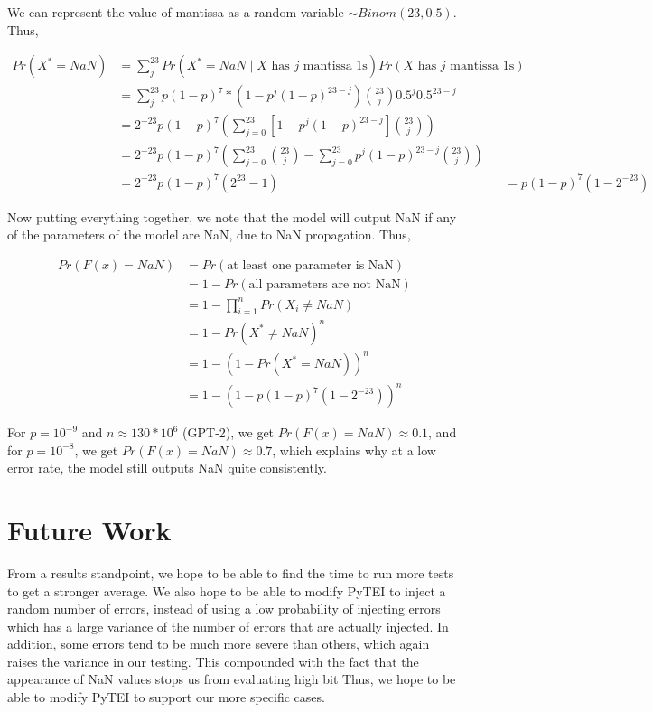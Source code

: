 \documentclass[a4paper]{article}
\begin{document}
We can represent the value of mantissa as a random variable $\sim Binom(23, 0.5)$. Thus,

\begin{align*}
	Pr(X^* = NaN) &= \sum_j^23 Pr(X^* = NaN \mid X \text{ has $j$ mantissa 1s})Pr(X\text{ has $j$ mantissa 1s}) \\
	&= \sum_j^23 p(1 - p)^7 * (1 - p^j(1 - p)^{23 - j})\binom{23}{j}0.5^j0.5^{23 - j} \\
	&= 2^{-23} p (1 - p)^7 \left(\sum_{j=0}^{23}[1 - p^j(1 - p)^{23 - j}] \binom{23}{j}\right) \\
	&= 2^{-23} p (1 - p)^7 \left(\sum_{j=0}^{23}\binom{23}{j} - \sum_{j=0}^{23}p^j(1 - p)^{23 - j} \binom{23}{j}\right) \\
	&= 2^{-23} p (1 - p)^7(2^23 - 1)
	&= p(1 - p)^7(1 - 2^{-23})
\end{align*}

Now putting everything together, we note that the model will output NaN if any of the parameters of the model are NaN, due to NaN propagation. Thus,

\begin{align*}
	Pr(F(x) = NaN) &= Pr(\text{at least one parameter is NaN}) \\
	&= 1 - Pr(\text{all parameters are not NaN}) \\
	&= 1 - \prod_{i=1}^n Pr(X_i \neq NaN) \\
	&= 1 - Pr(X^* \neq NaN)^n \\
	&= 1 - (1 - Pr(X^* = NaN))^n \\
	&= 1 - (1 - p(1 - p)^7(1 - 2^{-23}))^n
\end{align*}

For $p = 10^{-9}$ and $n \approx 130 * 10^6$ (GPT-2), we get $Pr(F(x) = NaN) \approx 0.1$, and for $p = 10^{-8}$, we get $Pr(F(x) = NaN) \approx 0.7$, which explains why at a low error rate, the model still outputs NaN quite consistently.

\section{Future Work}

From a results standpoint, we hope to be able to find the time to run more tests to get a stronger average. We also hope to be able to modify PyTEI to inject a random number of errors, instead of using a low probability of injecting errors which has a large variance of the number of errors that are actually injected. In addition, some errors tend to be much more severe than others, which again raises the variance in our testing. This compounded with the fact that the appearance of NaN values stops us from evaluating high bit Thus, we hope to be able to modify PyTEI to support our more specific cases.
\end{document}

